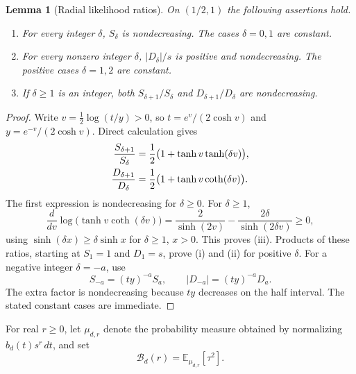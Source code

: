 \documentclass[11pt,a4paper]{article}
\numberwithin{equation}{section}
\newtheorem{lemma}[theorem]{Lemma}
\theoremstyle{definition}
\theoremstyle{remark}
\theoremstyle{plain}
\begin{document}
\begin{lemma}[Radial likelihood ratios]\label{xxb:dc:lem:ratios}
On $(1/2,1)$ the following assertions hold.
\begin{enumerate}[label=(\roman*),nosep]
\item For every integer $\delta$, $S_\delta$ is nondecreasing.  The cases
$\delta=0,1$ are constant.
\item For every nonzero integer $\delta$, $|D_\delta|/s$ is positive and
nondecreasing.  The positive cases $\delta=1,2$ are constant.
\item If $\delta\ge1$ is an integer, both
$S_{\delta+1}/S_\delta$ and $D_{\delta+1}/D_\delta$ are nondecreasing.
\end{enumerate}
\end{lemma}
\begin{proof}
Write $v=\frac12\log(t/y)>0$, so
$t=e^v/(2\cosh v)$ and $y=e^{-v}/(2\cosh v)$.  Direct calculation gives
\begin{align}\label{xxb:dc:eq:ratios}
 \frac{S_{\delta+1}}{S_\delta}
 &=\frac12\bigl(1+\tanh v\tanh(\delta v)\bigr),\notag\\
 \frac{D_{\delta+1}}{D_\delta}
 &=\frac12\bigl(1+\tanh v\coth(\delta v)\bigr).
\end{align}
The first expression is nondecreasing for $\delta\ge0$.  For $\delta\ge1$,
\[
 \frac{d}{dv}\log\bigl(\tanh v\coth(\delta v)\bigr)
 =\frac{2}{\sinh(2v)}-\frac{2\delta}{\sinh(2\delta v)}\ge0,
\]
using $\sinh(\delta x)\ge\delta\sinh x$ for $\delta\ge1$, $x>0$.
This proves (iii).  Products of these ratios, starting at $S_1=1$ and
$D_1=s$, prove (i) and (ii) for positive $\delta$.  For a negative integer
$\delta=-a$, use
\[
 S_{-a}=(ty)^{-a}S_a,\qquad |D_{-a}|=(ty)^{-a}D_a.
\]
The extra factor is nondecreasing because $ty$ decreases on the half
interval.  The stated constant cases are immediate.
\end{proof}

For real $r\ge0$, let $\mu_{d,r}$ denote the probability measure obtained
by normalizing $b_d(t)s^r\,dt$, and set
\begin{equation}\label{xxb:dc:eq:base-moment}
 \mathcal B_d(r)=\mathbb E_{\mu_{d,r}}[\tau^2].
\end{equation}
\end{document}
